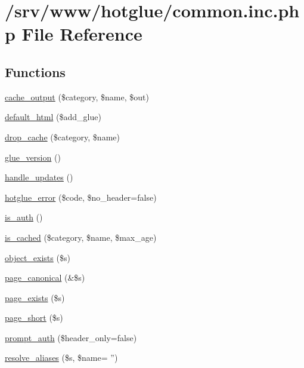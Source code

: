 \hypertarget{common_8inc_8php}{
\section{/srv/www/hotglue/common.inc.php File Reference}
\label{common_8inc_8php}
}
\subsection*{Functions}
\begin{DoxyCompactItemize}
\item 
\hyperlink{common_8inc_8php_a6cceb5c6a3c421c18e925515c78f6dfd}{cache\_\-output} (\$category, \$name, \$out)
\item 
\hyperlink{common_8inc_8php_a8916cb6ec34ceeb3f48c86655c305974}{default\_\-html} (\$add\_\-glue)
\item 
\hyperlink{common_8inc_8php_a7ca47f8aab349971cde2d4b02441cf41}{drop\_\-cache} (\$category, \$name)
\item 
\hyperlink{common_8inc_8php_a0d6d0da45f4adf6283bcccec9fd107e3}{glue\_\-version} ()
\item 
\hyperlink{common_8inc_8php_aa8712e8d1a52e2b8f00ecaf839205d24}{handle\_\-updates} ()
\item 
\hyperlink{common_8inc_8php_a7c4cb31a76aaf90f4399752ef35e00fe}{hotglue\_\-error} (\$code, \$no\_\-header=false)
\item 
\hyperlink{common_8inc_8php_ab3abbb2cd13e01231533e7cdc93da6db}{is\_\-auth} ()
\item 
\hyperlink{common_8inc_8php_a6fb34b9210b43349ca3eb16b2738a28b}{is\_\-cached} (\$category, \$name, \$max\_\-age)
\item 
\hyperlink{common_8inc_8php_a3d71a269e01b98748fb57719feef27be}{object\_\-exists} (\$s)
\item 
\hyperlink{common_8inc_8php_a31ed04b0c90ac3077e71743c307d45f8}{page\_\-canonical} (\&\$s)
\item 
\hyperlink{common_8inc_8php_aa71868111dd5b8af98df9cc9c968e523}{page\_\-exists} (\$s)
\item 
\hyperlink{common_8inc_8php_ada968adfb989aa09adaf29867208f1ab}{page\_\-short} (\$s)
\item 
\hyperlink{common_8inc_8php_a80c23c9d8ac02159151d6368506b1b54}{prompt\_\-auth} (\$header\_\-only=false)
\item 
\hyperlink{common_8inc_8php_a78992fdfae6cd9d7d4e8053d004d1709}{resolve\_\-aliases} (\$s, \$name= '')
\item 

\end{DoxyCompactItemize}
